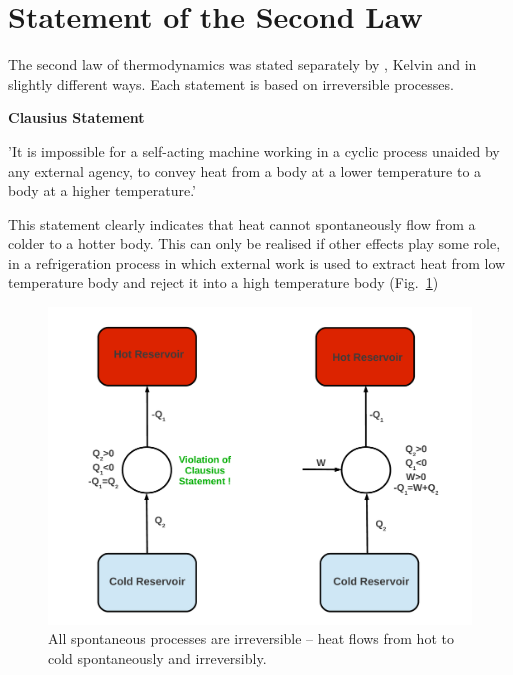    \section{Statement of the Second Law}\label{Chapter:SecondLaw:Section:SecondLawStatement}
The second law of thermodynamics was stated separately by \citet{Clausius_Book}, Kelvin \citep{Thomson_1851} and \citet{Planck_Book} in slightly different ways. Each statement is based on irreversible processes.
\begin{shaded}
  \begin{center}
    {\bf Clausius Statement}
  \end{center}
  'It is impossible for a self-acting machine working in a cyclic process unaided by any external agency, to convey heat from a body at a lower temperature to a body at a higher temperature.'
\end{shaded}
This statement clearly indicates that heat cannot spontaneously flow from a colder to a hotter body. This can only be realised if other effects play some role, \eg in a refrigeration process in which external work is used to extract heat from low temperature body and reject it into a high temperature body (Fig.~\ref{Chapter:SecondLaw:Fig:SecondLawStatement})

   \begin{figure}[h]
     \begin{center}
        \includegraphics[width=.8\columnwidth,clip]{./Figs/2ndLaw_Schem}
     \caption{All spontaneous processes are irreversible -- heat flows from hot to cold spontaneously and irreversibly. }\label{Chapter:SecondLaw:Fig:SecondLawStatement}
     \end{center}
   \end{figure} 


